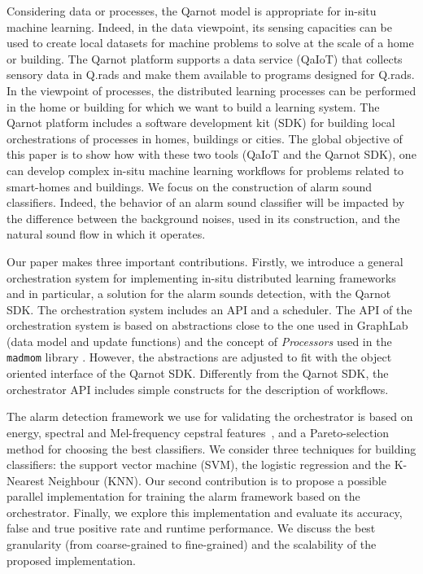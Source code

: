 \documentclass[10pt, conference, compsocconf]{IEEEtran}
\begin{document}
Considering data or processes, the Qarnot model is appropriate for in-situ machine learning. Indeed, in the data viewpoint, 
its sensing capacities can be used to create local datasets for machine problems to solve at the scale of a home or building. 
The Qarnot platform supports a data service (QaIoT) that collects sensory data in Q.rads 
and make them available to programs designed for Q.rads. 
In the viewpoint of processes, the distributed learning processes can be performed in the home or building for which we want to 
build a learning system. The Qarnot platform includes a software development kit (SDK) for building local orchestrations 
of processes in homes, buildings or cities.
The global objective of this paper is to show how with these two tools (QaIoT and the Qarnot SDK), 
one can develop complex in-situ machine learning workflows for problems related to smart-homes and buildings. 
We focus on the construction of alarm sound classifiers.  Indeed, the behavior of an alarm sound classifier will be impacted by the 
difference between the background noises, used in its construction, and the natural sound flow in which it operates. 

Our paper makes three important contributions. Firstly, we introduce a general orchestration system for implementing in-situ 
distributed learning frameworks and in particular, a solution for the alarm sounds detection, with the Qarnot SDK. 
The orchestration system includes an API and a scheduler. 
The API of the orchestration system is based on abstractions close to the one used in 
GraphLab~\cite{Low:2012:DGF:2212351.2212354} (data model and update functions) and the concept of {\it Processors} used 
in the \texttt{madmom} library \cite{DBLP:journals/corr/BockKSKW16}. However, the abstractions are adjusted to fit with the 
object oriented interface of the Qarnot SDK. Differently from the Qarnot SDK, the orchestrator API includes simple 
constructs for the description of workflows. 

The alarm detection framework we use for validating the orchestrator is based on energy, spectral and Mel-frequency cepstral features~\cite{Davis:1990:CPR:108235.108239}, \cite{pyAudioAnalysis}
and a Pareto-selection method for choosing the best classifiers. We consider three techniques for building classifiers: the support vector machine (SVM), the logistic regression and the K-Nearest Neighbour (KNN). Our second contribution is to propose a possible parallel 
implementation for training the alarm framework based on the orchestrator. Finally, we explore this implementation and evaluate its accuracy, 
false and true positive rate and runtime performance. We discuss the best granularity (from coarse-grained to fine-grained) and the scalability of the proposed implementation.
\end{document}

